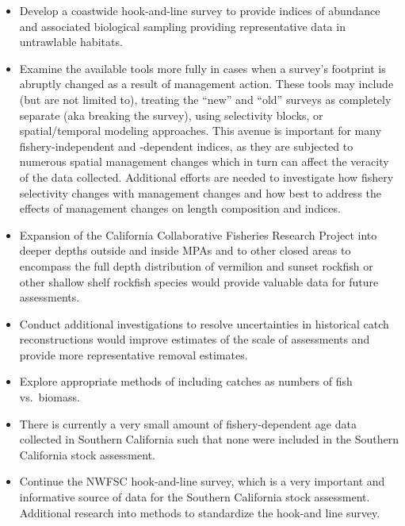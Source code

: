\documentclass[
  english,
  a4paper,
]{article}
\begin{document}
\begin{itemize}
\item
  Develop a coastwide hook-and-line survey to provide indices of abundance and associated biological sampling providing representative data in untrawlable habitats.
\item
  Examine the available tools more fully in cases when a survey's footprint is abruptly changed as a result of management action. These tools may include (but are not limited to), treating the ``new'' and ``old'' surveys as completely separate (aka breaking the survey), using selectivity blocks, or spatial/temporal modeling approaches. This avenue is important for many fishery-independent and -dependent indices, as they are subjected to numerous spatial management changes which in turn can affect the veracity of the data collected. Additional efforts are needed to investigate how fishery selectivity changes with management changes and how best to address the effects of management changes on length composition and indices.
\item
  Expansion of the California Collaborative Fisheries Research Project into deeper depths outside and inside MPAs and to other closed areas to encompass the full depth distribution of vermilion and sunset rockfish or other shallow shelf rockfish species would provide valuable data for future assessments.
\item
  Conduct additional investigations to resolve uncertainties in historical catch reconstructions would improve estimates of the scale of assessments and provide more representative removal estimates.
\item
  Explore appropriate methods of including catches as numbers of fish vs.~biomass.
\item
  There is currently a very small amount of fishery-dependent age data collected in Southern California such that none were included in the Southern California stock assessment.
\item
  Continue the NWFSC hook-and-line survey, which is a very important and informative source of data for the Southern California stock assessment. Additional research into methods to standardize the hook-and line survey.
\end{itemize}

\pagebreak
\setlength{\parskip}{5mm plus1mm minus1mm}
\setcounter{page}{1}
\renewcommand{\thefigure}{\arabic{figure}}
\renewcommand{\thetable}{\arabic{table}}
\setcounter{table}{0}
\setcounter{figure}{0}
\end{document}
